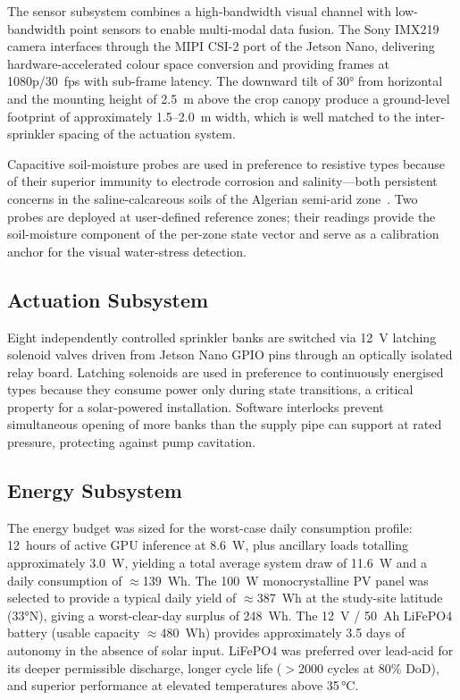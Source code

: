 \documentclass[12pt,a4paper]{report}
\begin{document}
The sensor subsystem combines a high-bandwidth visual channel with low-bandwidth point sensors to enable multi-modal data fusion. The Sony IMX219 camera interfaces through the MIPI CSI-2 port of the Jetson Nano, delivering hardware-accelerated colour space conversion and providing frames at 1080p/30~fps with sub-frame latency. The downward tilt of 30° from horizontal and the mounting height of 2.5~m above the crop canopy produce a ground-level footprint of approximately 1.5--2.0~m width, which is well matched to the inter-sprinkler spacing of the actuation system.

Capacitive soil-moisture probes are used in preference to resistive types because of their superior immunity to electrode corrosion and salinity---both persistent concerns in the saline-calcareous soils of the Algerian semi-arid zone~\cite{Tzounis2017}. Two probes are deployed at user-defined reference zones; their readings provide the soil-moisture component of the per-zone state vector and serve as a calibration anchor for the visual water-stress detection.

\subsection{Actuation Subsystem}

Eight independently controlled sprinkler banks are switched via 12~V latching solenoid valves driven from Jetson Nano GPIO pins through an optically isolated relay board. Latching solenoids are used in preference to continuously energised types because they consume power only during state transitions, a critical property for a solar-powered installation. Software interlocks prevent simultaneous opening of more banks than the supply pipe can support at rated pressure, protecting against pump cavitation.

\subsection{Energy Subsystem}

The energy budget was sized for the worst-case daily consumption profile: 12~hours of active GPU inference at 8.6~W, plus ancillary loads totalling approximately 3.0~W, yielding a total average system draw of 11.6~W and a daily consumption of $\approx$139~Wh. The 100~W monocrystalline PV panel was selected to provide a typical daily yield of $\approx$387~Wh at the study-site latitude (33°N), giving a worst-clear-day surplus of 248~Wh. The 12~V / 50~Ah LiFePO4 battery (usable capacity $\approx$480~Wh) provides approximately 3.5 days of autonomy in the absence of solar input. LiFePO4 was preferred over lead-acid for its deeper permissible discharge, longer cycle life ($>$2000 cycles at 80\% DoD), and superior performance at elevated temperatures above 35\,°C.
\end{document}

